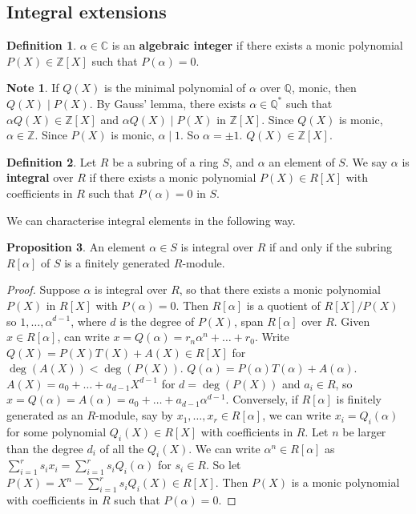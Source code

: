 \documentclass{article}
\newcommand{\Z}{\mathbb{Z}}
\newcommand{\Q}{\mathbb{Q}}
\newcommand{\C}{\mathbb{C}}
\newcommand{\rb}[1]{\left( #1 \right)}
\renewcommand{\sb}[1]{\left[ #1 \right]}
\theoremstyle{definition}\newtheorem{definition}{Definition}[subsection]
\theoremstyle{definition}\newtheorem{remark}[definition]{Remark}
\theoremstyle{definition}\newtheorem*{example}{Example}
\theoremstyle{definition}\newtheorem*{note}{Note}
\newtheorem{proposition}[definition]{Proposition}
\begin{document}
\subsection{Integral extensions}

\begin{definition}
$ \alpha \in \C $ is an \textbf{algebraic integer} if there exists a monic polynomial $ P\rb{X} \in \Z\sb{X} $ such that $ P\rb{\alpha} = 0 $.
\end{definition}

\begin{note}
If $ Q\rb{X} $ is the minimal polynomial of $ \alpha $ over $ \Q $, monic, then $ Q\rb{X} \mid P\rb{X} $. By Gauss' lemma, there exists $ \alpha \in \Q^* $ such that $ \alpha Q\rb{X} \in \Z\sb{X} $ and $ \alpha Q\rb{X} \mid P\rb{X} $ in $ \Z\sb{X} $. Since $ Q\rb{X} $ is monic, $ \alpha \in \Z $. Since $ P\rb{X} $ is monic, $ \alpha \mid 1 $. So $ \alpha = \pm 1 $. $ Q\rb{X} \in \Z\sb{X} $.
\end{note}

\begin{definition}
Let $ R $ be a subring of a ring $ S $, and $ \alpha $ an element of $ S $. We say $ \alpha $ is \textbf{integral} over $ R $ if there exists a monic polynomial $ P\rb{X} \in R\sb{X} $ with coefficients in $ R $ such that $ P\rb{\alpha} = 0 $ in $ S $.
\end{definition}

We can characterise integral elements in the following way.

\begin{proposition}
An element $ \alpha \in S $ is integral over $ R $ if and only if the subring $ R\sb{\alpha} $ of $ S $ is a finitely generated $ R $-module.
\end{proposition}

\begin{proof}
Suppose $ \alpha $ is integral over $ R $, so that there exists a monic polynomial $ P\rb{X} $ in $ R\sb{X} $ with $ P\rb{\alpha} = 0 $. Then $ R\sb{\alpha} $ is a quotient of $ R\sb{X} / P\rb{X} $ so $ 1, \dots, \alpha^{d - 1} $, where $ d $ is the degree of $ P\rb{X} $, span $ R\sb{\alpha} $ over $ R $. Given $ x \in R\sb{\alpha} $, can write $ x = Q\rb{\alpha} = r_n\alpha^n + \dots + r_0 $. Write $ Q\rb{X} = P\rb{X}T\rb{X} + A\rb{X} \in R\sb{X} $ for $ \deg\rb{A\rb{X}} < \deg\rb{P\rb{X}} $. $ Q\rb{\alpha} = P\rb{\alpha}T\rb{\alpha} + A\rb{\alpha} $. $ A\rb{X} = a_0 + \dots + a_{d - 1}X^{d - 1} $ for $ d = \deg\rb{P\rb{X}} $ and $ a_i \in R $, so $ x = Q\rb{\alpha} = A\rb{\alpha} = a_0 + \dots + a_{d - 1}\alpha^{d - 1} $. Conversely, if $ R\sb{\alpha} $ is finitely generated as an $ R $-module, say by $ x_1, \dots, x_r \in R\sb{\alpha} $, we can write $ x_i = Q_i\rb{\alpha} $ for some polynomial $ Q_i\rb{X} \in R\sb{X} $ with coefficients in $ R $. Let $ n $ be larger than the degree $ d_i $ of all the $ Q_i\rb{X} $. We can write $ \alpha^n \in R\sb{\alpha} $ as $ \sum_{i = 1}^r s_ix_i = \sum_{i = 1}^r s_iQ_i\rb{\alpha} $ for $ s_i \in R $. So let $ P\rb{X} = X^n - \sum_{i = 1}^r s_iQ_i\rb{X} \in R\sb{X} $. Then $ P\rb{X} $ is a monic polynomial with coefficients in $ R $ such that $ P\rb{\alpha} = 0 $.
\end{proof}
\end{document}
